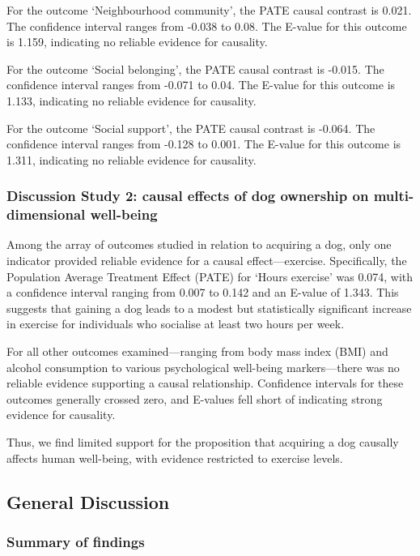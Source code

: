 \documentclass[
  singlecolumn,
  9pt]{article}
\begin{document}
For the outcome `Neighbourhood community', the PATE causal contrast is
0.021. The confidence interval ranges from -0.038 to 0.08. The E-value
for this outcome is 1.159, indicating no reliable evidence for
causality.

For the outcome `Social belonging', the PATE causal contrast is -0.015.
The confidence interval ranges from -0.071 to 0.04. The E-value for this
outcome is 1.133, indicating no reliable evidence for causality.

For the outcome `Social support', the PATE causal contrast is -0.064.
The confidence interval ranges from -0.128 to 0.001. The E-value for
this outcome is 1.311, indicating no reliable evidence for causality.

\subsubsection{Discussion Study 2: causal effects of dog ownership on
multi-dimensional
well-being}\label{discussion-study-2-causal-effects-of-dog-ownership-on-multi-dimensional-well-being}

Among the array of outcomes studied in relation to acquiring a dog, only
one indicator provided reliable evidence for a causal effect---exercise.
Specifically, the Population Average Treatment Effect (PATE) for `Hours
exercise' was 0.074, with a confidence interval ranging from 0.007 to
0.142 and an E-value of 1.343. This suggests that gaining a dog leads to
a modest but statistically significant increase in exercise for
individuals who socialise at least two hours per week.

For all other outcomes examined---ranging from body mass index (BMI) and
alcohol consumption to various psychological well-being markers---there
was no reliable evidence supporting a causal relationship. Confidence
intervals for these outcomes generally crossed zero, and E-values fell
short of indicating strong evidence for causality.

Thus, we find limited support for the proposition that acquiring a dog
causally affects human well-being, with evidence restricted to exercise
levels.

\subsection{General Discussion}\label{general-discussion}

\subsubsection{Summary of findings}\label{summary-of-findings}
\end{document}
